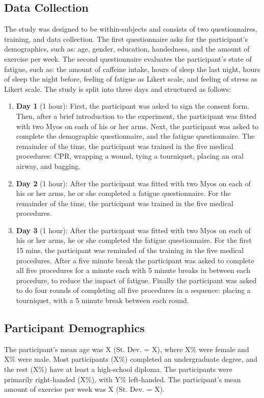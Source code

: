 \subsection{Data Collection}
\label{sec:Experimental-Design:Data-Collection}
The study was designed to be within-subjects and consists of two questionnaires, training, and data collection. The first questionnaire asks for the participant's demographics, such as: age, gender, education, handedness, and the amount of exercise per week. The second questionnaire evaluates the participant's state of fatigue, such as: the amount of caffeine intake, hours of sleep the last night, hours of sleep the night before, feeling of fatigue as Likert scale, and feeling of stress as Likert scale. The study is split into three days and structured as follows:
\begin{enumerate}
	\item \textbf{Day 1} (1 hour): First, the participant was asked to sign the consent form. Then, after a brief introduction to the experiment, the participant was fitted with two Myos on each of his or her arms. Next, the participant was asked to complete the demographic questionnaire, and the fatigue questionnaire. The remainder of the time, the participant was trained in the five medical procedures: CPR, wrapping a wound, tying a tourniquet, placing an oral airway, and bagging.
	\item \textbf{Day 2} (1 hour): After the participant was fitted with two Myos on each of his or her arms, he or she completed a fatigue questionnaire. For the remainder of the time, the participant was trained in the five medical procedures.
	\item \textbf{Day 3} (1 hour): After the participant was fitted with two Myos on each of his or her arms, he or she completed the fatigue questionnaire. For the first 15 mins, the participant was reminded of the training in the five medical procedures.
	After a five minute break the participant was asked to complete all five procedures for a minute each with 5 minute breaks in between each procedure, to reduce the impact of fatigue. Finally the participant was asked to do four rounds of completing all five procedures in a sequence: placing a tourniquet,  with a 5 minute break between each round.
\end{enumerate}

\subsection{Participant Demographics}
\label{sec:Data-Collection:Participant-Demographics}
The participant’s mean age was X (St. Dev. = X), where X\% were female and X\% were male. Most participants (X\%) completed an undergraduate degree, and the rest (X\%) have at least a high-school diploma. The participants were primarily right-handed (X\%), with Y\% left-handed. The participant's mean amount of exercise per week was X (St. Dev. = X).

